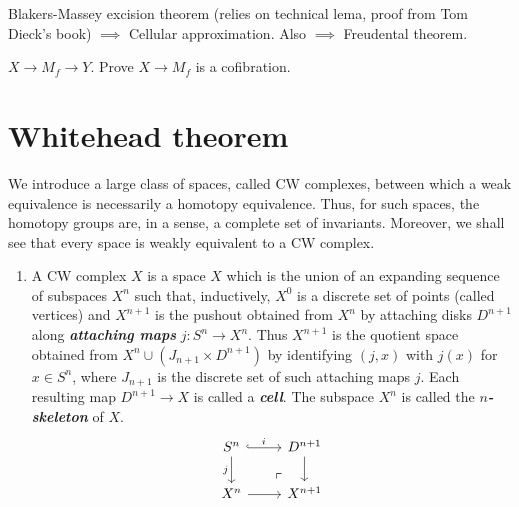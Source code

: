 \documentclass{article}
\numberwithin{equation}{section}
\begin{document}
\begin{remark}[Plan]
	Blakers-Massey excision theorem (relies on technical lema, proof from Tom Dieck's book) $\implies$ Cellular approximation. Also $\implies$ Freudental theorem.
\end{remark}
\begin{exercise}
	$X\to M_f\to Y$. Prove $X\to M_f$ is a cofibration.
\end{exercise}
\section{Whitehead theorem}
\iffalse\begin{defn}
	The appropriate analogue of the Cartesian product in the category of based spaces is the \textbf{\textit{smash product}} $X\wedge Y$ defined by
	\[X\wedge Y=X\times Y/X\vee Y.\]
	Here $X\vee Y$ is viewed as the subspace of $X\times Y$ consisting of those pairs $(x,y)$ such that either $x$ is the basepoint of $X$ or $y$ is the basepoint of $Y$.
\end{defn}\fi
We introduce a large class of spaces, called CW complexes, between which a weak equivalence is necessarily a homotopy equivalence. Thus, for such spaces, the homotopy groups are, in a sense, a complete set of invariants. Moreover, we shall see that every space is weakly equivalent to a CW complex.
\begin{defn}\leavevmode
	\begin{enumerate}
		\item A CW complex $X$ is a space $X$ which is the union of an expanding sequence of subspaces $X^n$ such that, inductively, $X^0$ is a discrete set of points (called vertices) and $X^{n+1}$ is the pushout obtained from $X^n$ by attaching disks $D^{n+1}$ along \textbf{\textit{attaching maps}} $j:S^n\to X^n$. {\color{cyan}Thus $X^{n+1}$ is the quotient space obtained from $X^n\cup(J_{n+1}\times D^{n+1})$ by identifying $(j,x)$ with $j(x)$ for $x\in S^n$, where $J_{n+1}$ is the discrete set of such attaching maps $j$}. Each resulting map $D^{n+1}\to X$ is called a \textbf{\textit{cell}}. The subspace $X^n$ is called the \textbf{\textit{$n$-skeleton}} of $X$.
			\[\begin{tikzcd}
			S^n\arrow[r,"i",hook]\arrow[d,swap,"j"]&D^{n+1}\arrow[d,]\\
			X^n\arrow[r]&X^{n+1}\arrow[ul, phantom, "\ulcorner", very near start]
		\end{tikzcd}\]
	\end{enumerate}
\end{defn}
\end{document}
